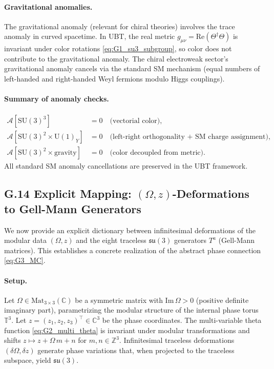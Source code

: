 \paragraph{Gravitational anomalies.}
The gravitational anomaly (relevant for chiral theories) involves the trace anomaly in curved spacetime. In UBT, the real metric $g_{\mu\nu}=\mathrm{Re}(\Theta^\dagger\Theta)$ is invariant under color rotations \eqref{eq:G1_su3_subgroup}, so color does not contribute to the gravitational anomaly. The chiral electroweak sector's gravitational anomaly cancels via the standard SM mechanism (equal numbers of left-handed and right-handed Weyl fermions modulo Higgs couplings).

\paragraph{Summary of anomaly checks.}
\begin{equation}
\begin{aligned}
\mathcal{A}[\mathrm{SU}(3)^3] &= 0 \quad \text{(vectorial color)}, \\
\mathcal{A}[\mathrm{SU}(3)^2 \times \mathrm{U}(1)_Y] &= 0 \quad \text{(left-right orthogonality + SM charge assignment)}, \\
\mathcal{A}[\mathrm{SU}(3)^2 \times \text{gravity}] &= 0 \quad \text{(color decoupled from metric)}.
\end{aligned}
\end{equation}
All standard SM anomaly cancellations are preserved in the UBT framework.

\subsection*{G.14 Explicit Mapping: \texorpdfstring{$(\Omega,z)$}{(Omega,z)}-Deformations to Gell-Mann Generators}
\label{sec:G14_mapping}

We now provide an explicit dictionary between infinitesimal deformations of the modular data $(\Omega,z)$ and the eight traceless $\mathfrak{su}(3)$ generators $T^a$ (Gell-Mann matrices). This establishes a concrete realization of the abstract phase connection \eqref{eq:G3_MC}.

\paragraph{Setup.}
Let $\Omega \in \mathrm{Mat}_{3\times 3}(\mathbb{C})$ be a symmetric matrix with $\mathrm{Im}\,\Omega > 0$ (positive definite imaginary part), parametrizing the modular structure of the internal phase torus $\mathbb{T}^3$. Let $z=(z_1,z_2,z_3)^{\top}\in \mathbb{C}^3$ be the phase coordinates. The multi-variable theta function \eqref{eq:G2_multi_theta} is invariant under modular transformations and shifts $z \mapsto z + \Omega\,m + n$ for $m,n\in\mathbb{Z}^3$. Infinitesimal traceless deformations $(\delta\Omega,\delta z)$ generate phase variations that, when projected to the traceless subspace, yield $\mathfrak{su}(3)$.

